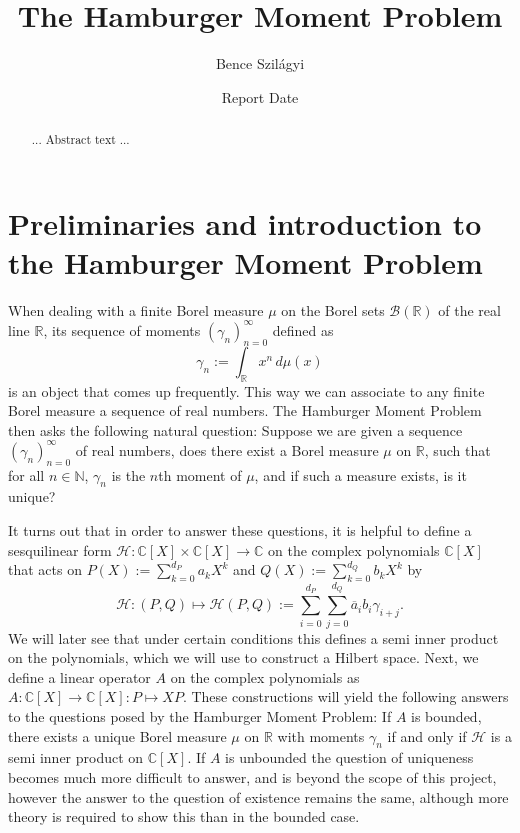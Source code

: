 \documentclass[12pt,oneside]{report}
\title{The Hamburger Moment Problem}
\date{Report Date}
\author{Bence Szilágyi}
\begin{document}
\newcommand{\Ran}{\mathrm{Ran}}
\newcommand{\supp}{\mathrm{supp}}
\newcommand{\spanrm}{\mathrm{span}}
\newcommand{\id}{\mathrm{id}}

\maketitle

\begin{abstract} ... Abstract text ... \end{abstract}
\declaration
\dedication{TODO: Dedication}

\tableofcontents
{}
\newpage
{}


\chapter{Preliminaries and introduction to the Hamburger Moment Problem}

When dealing with a finite Borel measure $\mu$ on the Borel sets $\mathcal{B}(\mathbb{R})$ of the real line $\mathbb{R}$, its sequence of moments $(\gamma_{n})_{n=0}^{\infty}$ defined as $$
\gamma_{n} := \int _{\mathbb{R}} x^{n} \, d\mu(x)
$$is an object that comes up frequently. This way we can associate to any finite Borel measure a sequence of real numbers. The Hamburger Moment Problem then asks the following natural question: Suppose we are given a sequence $(\gamma_{n})_{n=0}^{\infty}$ of real numbers, does there exist a Borel measure $\mu$ on $\mathbb{R}$, such that for all $n \in \mathbb{N}$, $\gamma_{n}$ is the $n$th moment of $\mu$, and if such a measure exists, is it unique?

It turns out that in order to answer these questions, it is helpful to define a sesquilinear form $\mathcal{H}: \mathbb{C}[X] \times \mathbb{C}[X] \to \mathbb{C}$ on the complex polynomials $\mathbb{C}[X]$ that acts on $P(X) := \sum_{k=0}^{d_{P}}a_{k}X^{k}$ and $Q(X) := \sum_{k=0}^{d_{Q}}b_{k}X^{k}$ by
$$\mathcal{H}: (P, Q) \mapsto \mathcal{H}(P,Q) := \sum_{i = 0}^{d_{P}} \sum_{j = 0}^{d_{Q}} \overline{a}_{i}b_{i}\gamma_{i+j}.$$
We will later see that under certain conditions this defines a semi inner product on the polynomials, which we will use to construct a Hilbert space. Next, we define a linear operator $A$ on the complex polynomials as $A: \mathbb{C}[X] \to \mathbb{C}[X]: P \mapsto XP$. These constructions will yield the following answers to the questions posed by the Hamburger Moment Problem: If $A$ is bounded, there exists a unique Borel measure $\mu$ on $\mathbb{R}$ with moments $\gamma_{n}$ if and only if $\mathcal{H}$ is a semi inner product on $\mathbb{C}[X]$. If $A$ is unbounded the question of uniqueness becomes much more difficult to answer, and is beyond the scope of this project, however the answer to the question of existence remains the same, although more theory is required to show this than in the bounded case.
\end{document}
